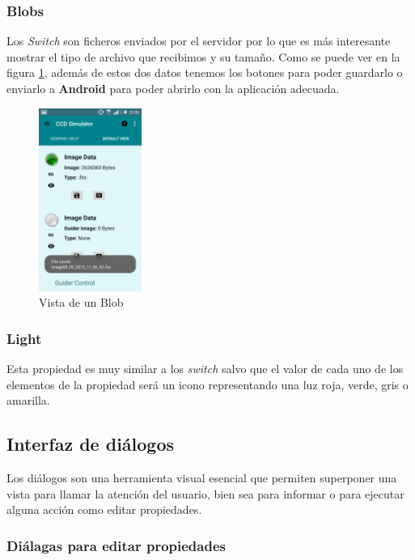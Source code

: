 \bigskip
\subsubsection{Blobs}
Los \textit{Switch} son ficheros enviados por el servidor por lo que es más interesante mostrar el tipo de archivo que recibimos y su tamaño. Como se puede ver en la figura \ref{fig:blob}, además de estos dos datos tenemos los botones para poder guardarlo o enviarlo a \textbf{Android} para poder abrirlo con la aplicación adecuada.

\bigskip
\begin{figure}[!ht]
  \begin{center}
  \includegraphics[width=0.3\textwidth]{../images/saveBlob2.png}
  \caption{Vista de un Blob}
  \label{fig:blob}
  \end{center}
\end{figure}

\bigskip
\subsubsection{Light}
Esta propiedad es muy similar a los \textit{switch} salvo que el valor de cada uno de los elementos de la propiedad será un icono representando una luz roja, verde, gris o amarilla.


\bigskip
\subsection{Interfaz de diálogos}

Los diálogos son una herramienta visual esencial que permiten superponer una vista para llamar la atención del usuario, bien sea para informar o para ejecutar alguna acción como editar propiedades.


\bigskip
\subsubsection{Diálagas para editar propiedades}

